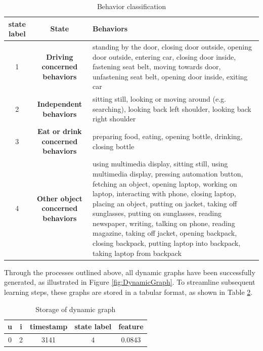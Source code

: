 \begin{table}[h]
    \centering
    \begin{tabular}{ccp{7cm}}
        \toprule
        \textbf{state label} & \textbf{State} & \textbf{Behaviors} \\
        \midrule
        1 & \textbf{Driving concerned behaviors} & standing by the door, closing door outside, opening door outside, entering car, closing door inside, fastening seat belt, moving towards door, unfastening seat belt, opening door inside, exiting car \\
        \midrule
        2 & \textbf{Independent behaviors} & sitting still, looking or moving around (e.g. searching), looking back left shoulder, looking back right shoulder \\
        \midrule
        3 & \textbf{Eat or drink concerned behaviors} & preparing food, eating, opening bottle, drinking, closing bottle \\
        \midrule
        4 & \textbf{Other object concerned behaviors} & using multimedia display, sitting still, using multimedia display, pressing automation button, fetching an object, opening laptop, working on laptop, interacting with phone, closing laptop, placing an object, putting on jacket, taking off sunglasses, putting on sunglasses, reading newspaper, writing, talking on phone, reading magazine, taking off jacket, opening backpack, closing backpack, putting laptop into backpack, taking laptop from backpack \\
        \bottomrule
    \end{tabular}
    \caption{Behavior classification}
    \label{tab:Behavior classification}
\end{table}



Through the processes outlined above, all dynamic graphs have been successfully generated, as illustrated in Figure \ref{fig:DynamicGraph}. To streamline subsequent learning steps, these graphs are stored in a tabular format, as shown in Table \ref{tab:dynamic_graph_storage}.



\begin{table}[h]
    \centering
    \begin{tabular}{ccccc}
        \toprule
        \textbf{u} & \textbf{i} & \textbf{timestamp} & \textbf{state label} & \textbf{feature} \\
        \midrule
        0 & 2 & 3141 & 4 & 0.0843 \\
        \bottomrule
    \end{tabular}
    \caption{Storage of dynamic graph}
    \label{tab:dynamic_graph_storage}
\end{table}

